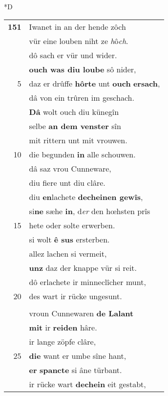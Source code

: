 \documentclass[8pt,a4paper,notitlepage]{article}
\begin{document}
\begin{table}[ht]
\begin{minipage}[t]{0.5\linewidth}
\small
\begin{center}*D
\end{center}
\begin{tabular}{rl}
\textbf{151} & Iwanet in an der hende zôch\\ 
 & vür eine louben niht ze \textit{h}ô\textit{ch}.\\ 
 & dô sach er vür und wider.\\ 
 & \textbf{ouch was diu loube} sô nider,\\ 
5 & daz er drûffe \textbf{hôrte} unt \textbf{ouch} \textbf{ersach},\\ 
 & dâ von ein trûren im geschach.\\ 
 & \textbf{Dâ} wolt ouch diu künegîn\\ 
 & selbe \textbf{an dem venster} sîn\\ 
 & mit rittern unt mit vrouwen.\\ 
10 & die begunden \textbf{in} alle schouwen.\\ 
 & dâ saz vrou Cunneware,\\ 
 & diu fiere unt diu clâre.\\ 
 & diu \textbf{en}lachete \textbf{decheinen gewîs},\\ 
 & si\textbf{ne} sæhe \textbf{in}, d\textit{er} den hœhsten prîs\\ 
15 & hete oder solte erwerben.\\ 
 & si wolt \textbf{ê sus} ersterben.\\ 
 & allez lachen si vermeit,\\ 
 & \textbf{unz} daz der knappe vür si reit.\\ 
 & dô erlachete ir minneclîcher munt,\\ 
20 & des wart ir rücke ungesunt.\\ 
 & \textbf{\begin{large}D\end{large}ô nam} Keie \textbf{scheneschalt}\\ 
 & vroun Cunnewaren \textbf{de Lalant}\\ 
 & \textbf{mit} ir \textbf{reiden} hâre.\\ 
 & ir lange zöpfe clâre,\\ 
25 & \textbf{die} want er umbe sîne hant,\\ 
 & \textbf{er} \textbf{spancte} si âne türbant.\\ 
 & ir rücke wart \textbf{dechein} eit gestabt,\\ 

\end{tabular}
\end{minipage}
\end{table}
\end{document}
